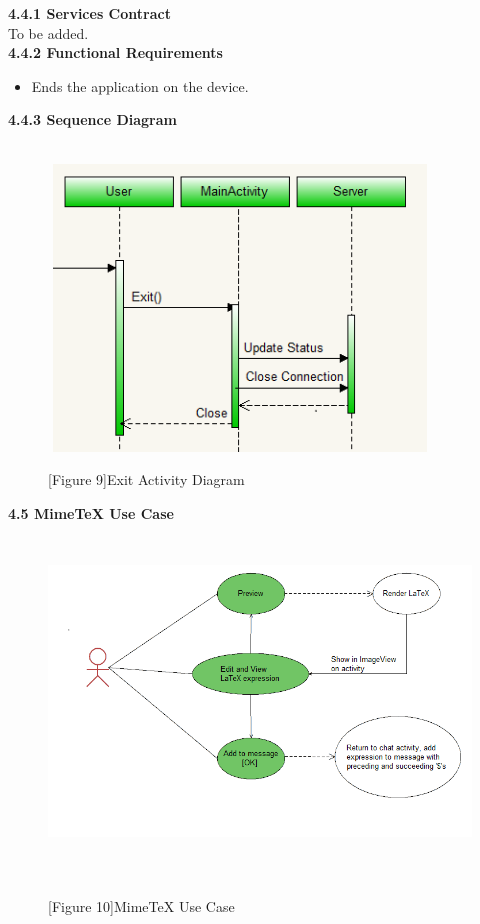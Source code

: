 \documentclass[29pt,a4paper]{moderncv}
\begin{document}
		\noindent\textbf{4.4.1 Services Contract}\\ 
		To be added.\\
		\textbf{4.4.2 Functional Requirements}
			\begin{itemize}
				\item Ends the application on the device.\\
			\end{itemize}
		\left\textbf{4.4.3 Sequence Diagram}
		\begin{figure}
			\centering
			\\ \includegraphics[width=4.0in, height=3.0in]{./exitActivity.png}
			\\\caption{[Figure 9]Exit Activity Diagram}
		\end{figure}
		
\newpage		
	\left\textbf{4.5 MimeTeX Use Case}
		\begin{figure}
			\centering
			\\ \includegraphics[width=6.0in, height=3.0in]{./MimeTeXUseCase.png}
			\\\caption{[Figure 10]MimeTeX Use Case}\\
		\end{figure}
		
\end{document}
